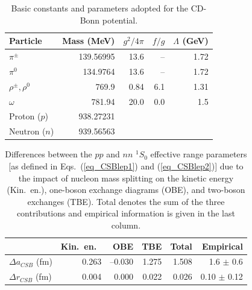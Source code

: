 \pagebreak


\begin{table}
\caption{Basic constants and parameters adopted for the CD-Bonn potential.}
\begin{tabular}{ldddd}
  Particle
 & Mass (MeV)
 & $g^2/4\pi$
 & $f/g$
 & $\Lambda$ (GeV)
\\
\hline 
$\pi^\pm$  &  139.56995  &  13.6  &  --   &  1.72  \\
$\pi^0$    &  134.9764   &  13.6  &  --   &  1.72  \\
$\rho^\pm, \rho^0$& 769.9 & 0.84  &  6.1  &  1.31  \\
$\omega$   &  781.94     &  20.0  &  0.0  &  1.5   \\
Proton ($p$)& 938.27231    \\
Neutron ($n$)&939.56563    \\
\end{tabular}
\label{tab_basicpar}
\end{table}



\vspace*{6cm}



\begin{table}
\caption{Differences between the $pp$ and $nn$ $^1S_0$ effective 
range parameters [as defined in 
Eqs.~(\ref{eq_CSBlep1})
and (\ref{eq_CSBlep2})]
due to the impact of
nucleon mass splitting on the kinetic energy (Kin.\ en.),
one-boson exchange diagrams (OBE), and two-boson exchanges (TBE).
Total denotes the sum of the three contributions and empirical
information is given in the last column.}
\begin{tabular}{lrrrrr}
   
 & Kin.\ en.\
 & OBE
 & TBE
 & Total
 & Empirical
\\
\hline 
$\Delta a_{CSB}$ (fm)&  0.263 & --0.030 &   1.275 &   1.508 & 1.6 $\pm$ 0.6 \\
$\Delta r_{CSB}$ (fm)&  0.004 &   0.000 &   0.022 &   0.026 & 0.10 $\pm$ 0.12\\
\end{tabular}
\label{tab_CSBlep}
\end{table}


\pagebreak




